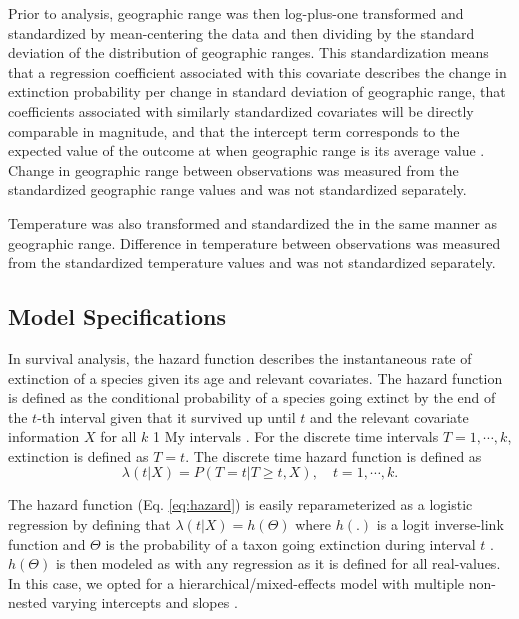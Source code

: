\documentclass[12pt,letterpaper]{article}
\begin{document}
\begin{refsection}
Prior to analysis, geographic range was then log-plus-one transformed and standardized by mean-centering the data and then dividing by the standard deviation of the distribution of geographic ranges. This standardization means that a regression coefficient associated with this covariate describes the change in extinction probability per change in standard deviation of geographic range, that coefficients associated with similarly standardized covariates will be directly comparable in magnitude, and that the intercept term corresponds to the expected value of the outcome at when geographic range is its average value \citep{ARM}. Change in geographic range between observations was measured from the standardized geographic range values and was not standardized separately.

Temperature was also transformed and standardized the in the same manner as geographic range. Difference in temperature between observations was measured from the standardized temperature values and was not standardized separately.



\subsection{Model Specifications} \label{sec:model_desc}

In survival analysis, the hazard function describes the instantaneous rate of extinction of a species given its age and relevant covariates. The hazard function is defined as the conditional probability of a species going extinct by the end of the \(t\)-th interval given that it survived up until \(t\) and the relevant covariate information \(X\) for all \(k\) 1 My intervals \citep{Tutz2016}. For the discrete time intervals \(T = 1, \cdots, k\), extinction is defined as \(T = t\). The discrete time hazard function is defined as
\begin{equation}
  \lambda(t | X) = P(T = t | T \geq t, X), \quad t = 1, \cdots, k.
  \label{eq:hazard}
\end{equation}

The hazard function (Eq. \ref{eq:hazard}) is easily reparameterized as a logistic regression by defining that \(\lambda(t | X) = h(\Theta)\) where \(h(.)\) is a logit inverse-link function and \(\Theta\) is the probability of a taxon going extinction during interval \(t\) \citep{Tutz2016}. \(h(\Theta)\) is then modeled as with any regression as it is defined for all real-values. In this case, we opted for a hierarchical/mixed-effects model with multiple non-nested varying intercepts and slopes \citep{ARM}.


\end{refsection}
\end{document}
